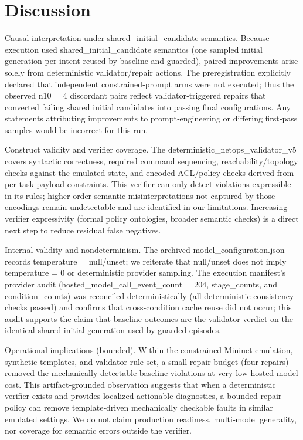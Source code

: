 \documentclass[conference]{IEEEtran}
\begin{document}
\section{Discussion}
Causal interpretation under shared\_initial\_candidate semantics. Because execution used shared\_initial\_candidate semantics (one sampled initial generation per intent reused by baseline and guarded), paired improvements arise solely from deterministic validator/repair actions. The preregistration explicitly declared that independent constrained‑prompt arms were not executed; thus the observed n10 = 4 discordant pairs reflect validator‑triggered repairs that converted failing shared initial candidates into passing final configurations. Any statements attributing improvements to prompt‑engineering or differing first‑pass samples would be incorrect for this run.

Construct validity and verifier coverage. The deterministic\_netops\_validator\_v5 covers syntactic correctness, required command sequencing, reachability/topology checks against the emulated state, and encoded ACL/policy checks derived from per‑task payload constraints. This verifier can only detect violations expressible in its rules; higher‑order semantic misinterpretations not captured by those encodings remain undetectable and are identified in our limitations. Increasing verifier expressivity (formal policy ontologies, broader semantic checks) is a direct next step to reduce residual false negatives.

Internal validity and nondeterminism. The archived model\_configuration.json records temperature = null/unset; we reiterate that null/unset does not imply temperature = 0 or deterministic provider sampling. The execution manifest's provider audit (hosted\_model\_call\_event\_count = 204, stage\_counts, and condition\_counts) was reconciled deterministically (all deterministic consistency checks passed) and confirms that cross‑condition cache reuse did not occur; this audit supports the claim that baseline outcomes are the validator verdict on the identical shared initial generation used by guarded episodes.

Operational implications (bounded). Within the constrained Mininet emulation, synthetic templates, and validator rule set, a small repair budget (four repairs) removed the mechanically detectable baseline violations at very low hosted‑model cost. This artifact‑grounded observation suggests that when a deterministic verifier exists and provides localized actionable diagnostics, a bounded repair policy can remove template‑driven mechanically checkable faults in similar emulated settings. We do not claim production readiness, multi‑model generality, nor coverage for semantic errors outside the verifier.
\end{document}
